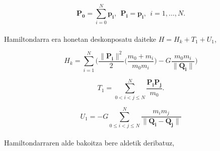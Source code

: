 \begin{equation*}
\mathbf{P_0}=\sum\limits_{i=0}^{N}\mathbf{p_i}, \ \ \mathbf{P_i}=\mathbf{p_i}, \ \ i=1,\dots{,N}.
\end{equation*}

\paragraph*{} Hamiltondarra era honetan deskonposatu daiteke $H=H_k+T_1+U_1$,

\begin{equation*}
H_k=\sum\limits_{i=1}^{N}\bigg(\frac{\|\mathbf{P_i}\|^2}{2} \big(\frac{m_0+m_i}{m_0m_i}\big)-G \frac{m_0m_i}{\|\mathbf{Q_i}\|}\bigg)
\end{equation*} 

\begin{equation*}
T_1=\sum\limits_{0<i<j\le N}^{N} \frac{\mathbf{P_i}\mathbf{P_j}}{m_0}.
\end{equation*}

\begin{equation*}
U_1= -G \sum\limits_{0\le i<j\le N}^{N} \frac{m_im_j}{\|\mathbf{Q_i}-\mathbf{Q_j}\|}
\end{equation*}

\paragraph*{}Hamiltondarraren alde bakoitza bere aldetik deribatuz,


